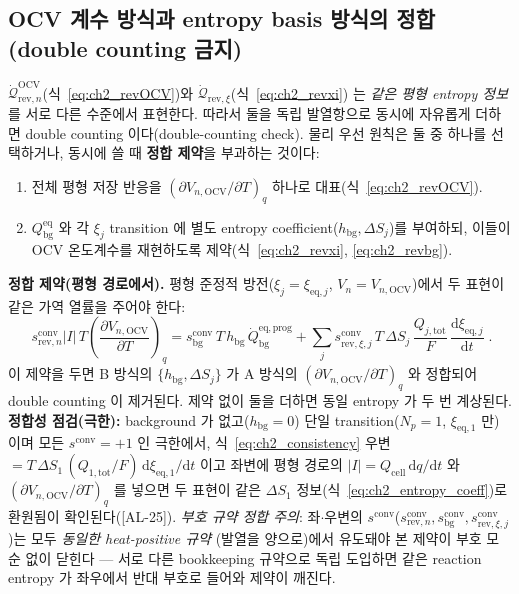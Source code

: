 \documentclass[11pt,a4paper]{article}
\newcommand{\dd}{\mathrm{d}}
\newcommand{\eq}{\mathrm{eq}}
\newcommand{\bg}{\mathrm{bg}}
\newcommand{\cell}{\mathrm{cell}}
\newcommand{\OCV}{\mathrm{OCV}}
\newcommand{\tot}{\mathrm{tot}}
\newcommand{\rev}{\mathrm{rev}}
\newcommand{\conv}{\mathrm{conv}}
\newcommand{\prog}{\mathrm{prog}}
\newcommand{\AL}[1]{\textsf{[AL-#1]}}
\begin{document}
\subsection{OCV 계수 방식과 entropy basis 방식의 정합 (double counting 금지)}\label{sec:ch2_double}
$\dot{\mathcal Q}_{\rev,n}^{\OCV}$(식~\eqref{eq:ch2_revOCV})와 $\dot{\mathcal Q}_{\rev,\xi}$(식~\eqref{eq:ch2_revxi})
는 \emph{같은 평형 entropy 정보}를 서로 다른 수준에서 표현한다. 따라서 둘을 독립 발열항으로 동시에 자유롭게 더하면
double counting 이다(double-counting check). 물리 우선 원칙은 둘 중 하나를 선택하거나, 동시에 쓸 때 \textbf{정합 제약}을
부과하는 것이다:
\begin{enumerate}[label=\Alph*),leftmargin=2.0em]
\item 전체 평형 저장 반응을 $(\partial V_{n,\OCV}/\partial T)_q$ 하나로 대표(식~\eqref{eq:ch2_revOCV}).
\item $Q_\bg^{\eq}$ 와 각 $\xi_j$ transition 에 별도 entropy coefficient($h_\bg,\Delta S_j$)를 부여하되, 이들이
  OCV 온도계수를 재현하도록 제약(식~\eqref{eq:ch2_revxi}, \eqref{eq:ch2_revbg}).
\end{enumerate}
\textbf{정합 제약(평형 경로에서).} 평형 준정적 방전($\xi_j=\xi_{\eq,j}$, $V_n=V_{n,\OCV}$)에서 두 표현이 같은
가역 열률을 주어야 한다:
\begin{equation}
\boxed{\;s_{\rev,n}^{\conv}|I|\,T\left(\frac{\partial V_{n,\OCV}}{\partial T}\right)_q
=s_\bg^{\conv}\,T\,h_\bg\,\dot Q_\bg^{\eq,\prog}
+\sum_{j}s_{\rev,\xi,j}^{\conv}\,T\,\Delta S_j\,\frac{Q_{j,\tot}}{F}\,\frac{\dd\xi_{\eq,j}}{\dd t}\;.}
\label{eq:ch2_consistency}
\end{equation}
이 제약을 두면 B 방식의 $\{h_\bg,\Delta S_j\}$ 가 A 방식의 $(\partial V_{n,\OCV}/\partial T)_q$ 와 정합되어
double counting 이 제거된다. 제약 없이 둘을 더하면 동일 entropy 가 두 번 계상된다. \textbf{정합성 점검(극한):}
background 가 없고($h_\bg=0$) 단일 transition($N_p=1$, $\xi_{\eq,1}$ 만) 이며 모든 $s^{\conv}=+1$ 인 극한에서,
식~\eqref{eq:ch2_consistency} 우변 $=T\,\Delta S_1\,(Q_{1,\tot}/F)\,\dd\xi_{\eq,1}/\dd t$ 이고 좌변에 평형
경로의 $|I|=Q_\cell\,\dd q/\dd t$ 와 $(\partial V_{n,\OCV}/\partial T)_q$ 를 넣으면 두 표현이 같은 $\Delta S_1$
정보(식~\eqref{eq:ch2_entropy_coeff})로 환원됨이 확인된다(\AL{25}). \emph{부호 규약 정합 주의}: 좌$\cdot$우변의
$s^{\conv}$($s_{\rev,n}^{\conv},s_\bg^{\conv},s_{\rev,\xi,j}^{\conv}$)는 모두 \emph{동일한 heat-positive 규약}
(발열을 양으로)에서 유도돼야 본 제약이 부호 모순 없이 닫힌다 — 서로 다른 bookkeeping 규약으로 독립 도입하면 같은
reaction entropy 가 좌우에서 반대 부호로 들어와 제약이 깨진다.
\end{document}
